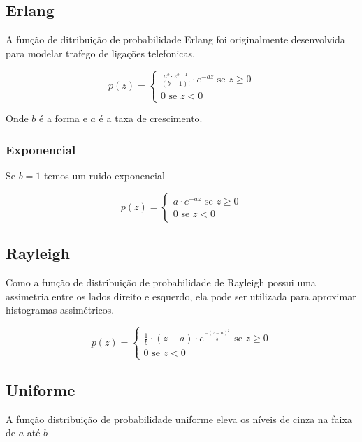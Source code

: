 \documentclass[10pt,a4paper]{article}
\begin{document}
\subsection{Erlang}
A função de ditribuição de probabilidade Erlang foi originalmente desenvolvida para modelar trafego de ligações telefonicas.

\begin{equation}
p(z) = \left\{
    \begin{array}{l}
        \frac{a^{b}\cdot z^{b-1}}{(b - 1)!} \cdot e^{-a z} \text{ se } z \ge 0 \\
        0 \text{ se } z < 0
    \end{array}\right.
    \end{equation}

Onde $b$ é a forma e $a$ é a taxa de crescimento.

\subsubsection{Exponencial}
Se $b = 1$ temos um ruido exponencial

\begin{equation}
p(z) = \left\{
    \begin{array}{l}
        a \cdot e^{-a z} \text{ se } z \ge 0 \\
        0 \text{ se } z < 0
    \end{array}\right.
\end{equation}

\subsection{Rayleigh}
Como a função de distribuição de probabilidade de Rayleigh possui uma assimetria entre os lados direito e esquerdo, ela pode ser utilizada para aproximar histogramas assimétricos.

\begin{equation}
p(z) = \left\{
    \begin{array}{l}
        \frac{1}{b} \cdot (z - a) \cdot e^{\frac{-(z-a)^2}{b}} \text{ se } z \ge 0 \\
        0 \text{ se } z < 0
    \end{array}\right.
\end{equation}

\subsection{Uniforme}
A função distribuição de probabilidade uniforme eleva os níveis de cinza na faixa de $a$ até $b$
\end{document}
